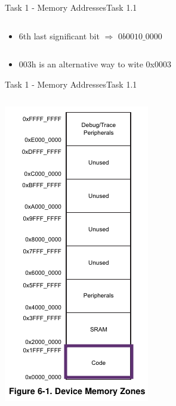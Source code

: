 {\begin{frame}[allowframebreaks]{Task 1 - Memory Addresses}{Task 1.1}
\begin{solution}
\begin{columns}
\begin{column}{0.6\paperwidth}
\begin{itemize}
          \item 6th last significant bit $\Rightarrow$ $0b0010\_0000$
        \end{itemize}
      \end{column}
    \end{columns}
  \end{solution}
  \begin{Sidenote}
    \begin{itemize}
      \item 003h is an alternative way to wite 0x0003
    \end{itemize}
  \end{Sidenote}
\end{frame}

\begin{frame}[allowframebreaks]{Task 1 - Memory Addresses}{Task 1.1\vspace{0.25cm}}
  \begin{solution}
    \begin{columns}
      \begin{column}{0.3\paperwidth}
        \centering
        \includegraphics[height=0.4\paperheight]{./figures/code.png}

\end{column}
\end{columns}
\end{solution}
\end{frame}}
